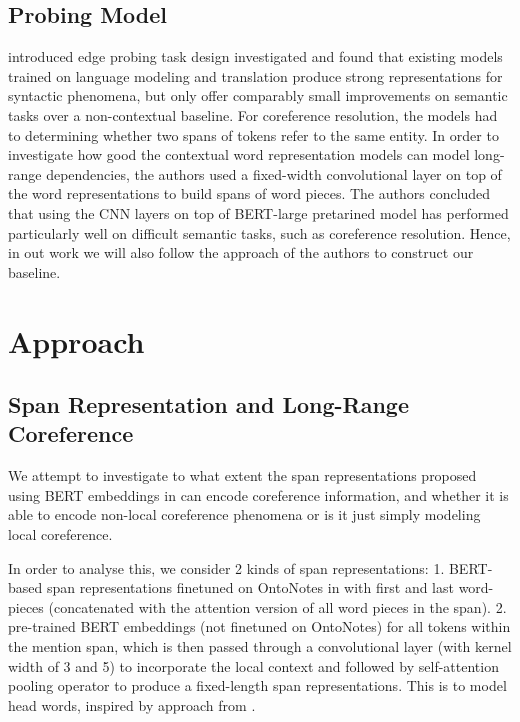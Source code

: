 \documentclass[11pt]{article}
\begin{document}
\subsection{Probing Model}



\textcite{tenney2019context} introduced edge probing task design investigated and found that existing models trained on language modeling and translation produce strong representations for syntactic phenomena, but only offer comparably small improvements on semantic tasks over a non-contextual baseline. For coreference resolution, the models had to determining whether two spans of tokens refer to the same entity. In order to investigate how good the contextual word representation models can model long-range dependencies, the authors used a fixed-width convolutional layer on top of the word representations to build spans of word pieces. The authors concluded that using the CNN layers on top of BERT-large pretarined model has performed particularly well on difficult semantic tasks, such as coreference resolution. Hence, in out work we will also follow the approach of the authors to construct our baseline. 



\section{Approach}


\subsection{Span Representation and Long-Range Coreference}

We attempt to investigate to what extent the span representations proposed using BERT \parencite{devlin2019bert} embeddings in \textcite{joshi2019coref} can encode coreference information, and whether it is able to encode non-local coreference phenomena or is it just simply modeling local coreference.

In order to analyse this, we consider 2 kinds of span representations:
1. BERT-based span representations finetuned on OntoNotes in \textcite{joshi2019coref} with first and last word-pieces (concatenated with the attention version of all word pieces in the span).
2. pre-trained BERT embeddings (not finetuned on OntoNotes) for all tokens within the mention span, which is then passed through a convolutional layer (with kernel width of 3 and 5) to incorporate the local context and followed by self-attention pooling operator to produce a fixed-length span representations. This is to model head words, inspired by approach from \textcite{tenney2019context}.
\end{document}
